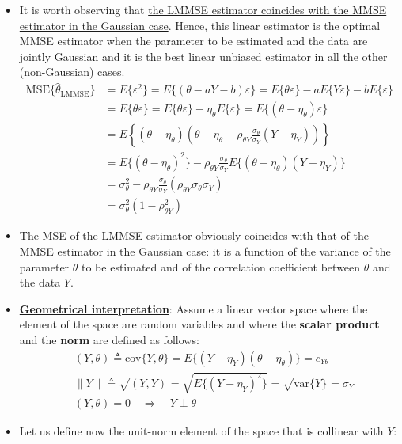 \begin{itemize}
\item It is worth observing that \underline{the LMMSE estimator coincides with the MMSE estimator in the Gaussian case}. Hence, this linear estimator is the optimal MMSE estimator when the parameter to be estimated and the data are jointly Gaussian and it is the best linear unbiased estimator in all the other (non-Gaussian) cases.
\begin{align*}
\text{MSE}\{\hat{\theta}_{\text{LMMSE}}\} &= E\{\varepsilon^2\} = E\{(\theta - aY - b)\varepsilon\} = E\{\theta\varepsilon\} - aE\{Y\varepsilon\} - bE\{\varepsilon\} \\[8pt]
&= E\{\theta\varepsilon\} = E\{\theta\varepsilon\} - \eta_{\theta}E\{\varepsilon\} = E\{(\theta - \eta_{\theta})\varepsilon\} \\[8pt]
&= E\left\{(\theta - \eta_{\theta})\left(\theta - \eta_{\theta} - \rho_{\theta Y}\frac{\sigma_{\theta}}{\sigma_{Y}}(Y - \eta_{Y})\right)\right\} \\[8pt]
&= E\{(\theta - \eta_{\theta})^2\} - \rho_{\theta Y}\frac{\sigma_{\theta}}{\sigma_{Y}}E\{(\theta - \eta_{\theta})(Y - \eta_{Y})\} \\[8pt]
&= \sigma_{\theta}^2 - \rho_{\theta Y}\frac{\sigma_{\theta}}{\sigma_{Y}}(\rho_{\theta Y}\sigma_{\theta}\sigma_{Y}) \\[8pt]
&= \sigma_{\theta}^2(1 - \rho_{\theta Y}^2)
\end{align*}
\item The MSE of the LMMSE estimator obviously coincides with that of the MMSE estimator in the Gaussian case: it is a function of the variance of the parameter \(\theta\) to be estimated and of the correlation coefficient between \(\theta\) and the data \(Y\).
\item \underline{\textbf{Geometrical interpretation}}: Assume a linear vector space where the element of the space are random variables and where the \textbf{scalar product} and the \textbf{norm} are defined as follows:
\begin{align*}
&(Y, \theta) \triangleq \text{cov}\{Y, \theta\} = E\{(Y - \eta_{Y})(\theta - \eta_{\theta})\} = c_{Y\theta} \\[8pt]
&\|Y\| \triangleq \sqrt{(Y, Y)} = \sqrt{E\{(Y - \eta_{Y})^2\}} = \sqrt{\text{var}\{Y\}} = \sigma_{Y} \\[8pt]
&(Y, \theta) = 0 \quad \Rightarrow \quad Y \perp \theta
\end{align*}
\item Let us define now the unit-norm element of the space that is collinear with \(Y\):


\end{itemize}
